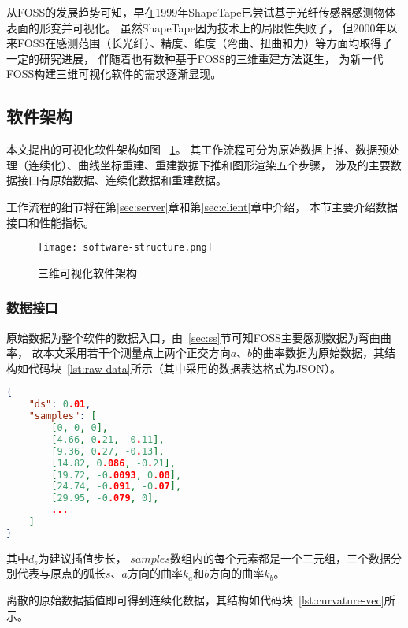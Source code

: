 从FOSS的发展趋势可知，早在1999年ShapeTape已尝试基于光纤传感器感测物体表面的形变并可视化。
虽然ShapeTape因为技术上的局限性失败了，
但2000年以来FOSS在感测范围（长光纤）、精度、维度（弯曲、扭曲和力）等方面均取得了一定的研究进展，
伴随着也有数种基于FOSS的三维重建方法诞生，
为新一代FOSS构建三维可视化软件的需求逐渐显现。

\FloatBarrier

\subsection{软件架构}

本文提出的可视化软件架构如图 ~\ref{fig:software}。
其工作流程可分为原始数据上推、数据预处理（连续化）、曲线坐标重建、重建数据下推和图形渲染五个步骤，
涉及的主要数据接口有原始数据、连续化数据和重建数据。

工作流程的细节将在第\ref{sec:server}章和第\ref{sec:client}章中介绍，
本节主要介绍数据接口和性能指标。

\FloatBarrier
\begin{figure}[H]
\centering
\texttt{[image: software-structure.png]}
\caption{三维可视化软件架构}
\label{fig:software} 
\end{figure}

\FloatBarrier

\subsubsection{数据接口}

原始数据为整个软件的数据入口，由~\ref{sec:ss}节可知FOSS主要感测数据为弯曲曲率，
故本文采用若干个测量点上两个正交方向$a$、$b$的曲率数据为原始数据，其结构如代码块~\ref{lst:raw-data}所示（其中采用的数据表达格式为JSON\cite{rfc7159}）。

\begin{lstlisting}[language=json,firstnumber=1,label={lst:raw-data},caption={原始曲率数据样例}]
{
    "ds": 0.01,
    "samples": [
        [0, 0, 0],
        [4.66, 0.21, -0.11],
        [9.36, 0.27, -0.13],
        [14.82, 0.086, -0.21],
        [19.72, -0.0093, 0.08],
        [24.74, -0.091, -0.07],
        [29.95, -0.079, 0],
        ...
    ]
}
\end{lstlisting}

其中$d_s$为建议插值步长，
$samples$数组内的每个元素都是一个三元组，三个数据分别代表与原点的弧长$s$、$a$方向的曲率$k_a$和$b$方向的曲率$k_b$。

离散的原始数据插值即可得到连续化数据，其结构如代码块~\ref{lst:curvature-vec}所示。

